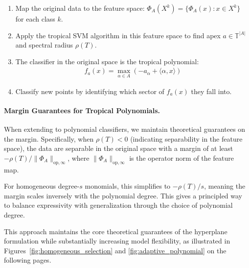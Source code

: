 \documentclass{article}
\newcommand{\trop}{\mathbb{T}}
\begin{document}
\begin{enumerate}
    \item Map the original data to the feature space: $\Phi_A(X^k) = \{\Phi_A(x) : x \in X^k\}$ for each class $k$.
    
    \item Apply the tropical SVM algorithm in this feature space to find apex $a \in \trop^{|A|}$ and spectral radius $\rho(T)$.
    
    \item The classifier in the original space is the tropical polynomial:
    \begin{align}
    f_a(x) = \max_{\alpha \in A} (-a_\alpha + \langle \alpha, x \rangle)
    \end{align}
    
    \item Classify new points by identifying which sector of $f_a(x)$ they fall into.
\end{enumerate}

\paragraph{Margin Guarantees for Tropical Polynomials.}
When extending to polynomial classifiers, we maintain theoretical guarantees on the margin. Specifically, when $\rho(T)<0$ (indicating separability in the feature space), the data are separable in the original space with a margin of at least $-\rho(T)/\lVert \Phi_A\rVert_{\text{op},\infty}$, where $\lVert \Phi_A\rVert_{\text{op},\infty}$ is the operator norm of the feature map.

For homogeneous degree-$s$ monomials, this simplifies to $-\rho(T)/s$, meaning the margin scales inversely with the polynomial degree. This gives a principled way to balance expressivity with generalization through the choice of polynomial degree.

This approach maintains the core theoretical guarantees of the hyperplane formulation while substantially increasing model flexibility, as illustrated in Figures~\ref{fig:homogeneous_selection} and \ref{fig:adaptive_polynomial} on the following pages.

\newpage
\end{document}
